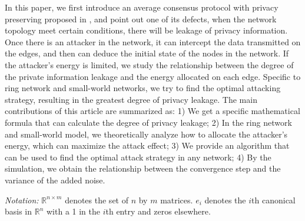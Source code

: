 \documentclass[10pt,journal,compsoc]{IEEEtran}
\begin{document}
In this paper, we first introduce an average consensus protocol with privacy preserving proposed in \cite{Manitara2013Privacy}, and point out one of its defects, when the network topology meet certain conditions, there will be leakage of privacy information. Once there is an attacker in the network, it can intercept the data transmitted on the edges, and then can deduce the initial state of the nodes in the network. If the attacker's energy is limited, we study the relationship between the degree of the private information leakage and the energy allocated on each edge. Specific to ring network and small-world networks, we try to find the optimal attacking strategy, resulting in the greatest degree of privacy leakage. The main contributions of this article are summarized as: 1) We get a specific mathematical formula that can calculate the degree of privacy leakage; 2) In the ring network and small-world model, we theoretically analyze how to allocate the attacker's energy, which can maximize the attack effect; 3) We provide an algorithm that can be used to find the optimal attack strategy in any network; 4) By the simulation, we obtain the relationship between the convergence step and the variance of the added noise.

\emph{Notation:} $\mathbb{R}^{n\times m}$ denotes the set of $n$ by $m$ matrices. $e_{i}$ denotes the $i$th canonical basis in $\mathbb{R}^{n}$ with a 1 in the $i$th entry and zeros elsewhere.
\end{document}
